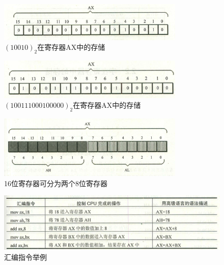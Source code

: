 \begin{frame}
  \begin{figure}
    \centering
    \includegraphics[width=3.5in]{slide01/images/tongyongjicunqi2}
    \caption{$(10010)_2$在寄存器AX中的存储}
  \end{figure}
  
  \begin{figure}
    \centering
    \includegraphics[width=3.5in]{slide01/images/tongyongjicunqi3}
    \caption{$(100111000100000)_2$在寄存器AX中的存储}
  \end{figure}
\end{frame}
% 
% 
% 
\begin{frame}
  \begin{figure}
    \centering
    \includegraphics[width=3.5in]{slide01/images/tongyongjicunqi4}
    \caption{16位寄存器可分为两个8位寄存器}
  \end{figure}
\end{frame}

\begin{frame}
  \begin{figure}
    \centering
    \includegraphics[width=4.5in]{slide01/images/huibianzhiling1}
    \caption{汇编指令举例}
  \end{figure}
\end{frame}


